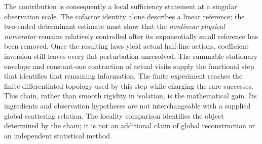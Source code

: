 The contribution is consequently a local sufficiency statement at a
singular observation scale.  The cofactor identity alone describes a
linear reference; the two-ended determinant estimate must show that the
\emph{nonlinear physical numerator} remains relatively controlled after
its exponentially small reference has been removed.  Once the resulting
laws yield actual half-line actions, coefficient inversion still leaves
every flat perturbation unresolved.  The summable stationary envelope and
constant-one contraction of actual visits supply the functional step that
identifies that remaining information.  The finite experiment reaches the
finite differentiated topology used by this step while charging the rare
successes.  This chain, rather than smooth rigidity in isolation, is the
mathematical gain.  Its ingredients and observation hypotheses are not
interchangeable with a supplied global scattering relation.  The locality
comparison identifies the object determined by the chain; it is not an
additional claim of global reconstruction or an independent statistical
method.
